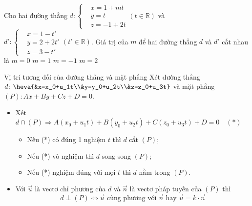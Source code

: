 \begin{ex}
	Cho hai đường thẳng $d: \left \lbrace \begin{aligned} &x=1+mt\\ &y=t  \\&z=-1+2t   \end{aligned} \right. (t \in \mathbb{R})$ và $d': \left \lbrace \begin{aligned} &x=1-t'\\ &y=2+2t'\\&z=3-t'   \end{aligned} \right. (t' \in \mathbb{R})$. Giá trị của $m$ để hai đường thẳng $d$ và $d'$ cắt nhau là
	\choice
	{\True $m=0$}
	{$m=1$}
	{$m=-1$}
	{$m=2$}
\end{ex}
\begin{dang}{Vị trí tương đối của đường thẳng và mặt phẳng}
	Xét đường thẳng $d \colon \heva{&x=x_0+u_1t\\&y=y_0+u_2t\\&z=z_0+u_3t}$ và mặt phẳng $(P) \colon Ax + By + Cz + D =0$.
	\begin{itemize}
		\item [\iconMT]  Xét $d \cap (P) \Rightarrow A(x_0+u_1t)+B(y_0+u_2t)+C(z_0+u_3t)+D=0 \quad (*)$
			\begin{itemize}
				\item [$\bullet$] Nếu (*) có đúng 1 nghiệm $t$ thì $d$ cắt $(P)$;
				\item [$\bullet$] Nếu (*) vô nghiệm  thì $d$ song song $(P)$;
				\item [$\bullet$] Nếu (*) nghiệm đúng với mọi $t$ thì $d$ nằm trong $(P)$.
			\end{itemize}
		\item [\iconMT]  Với $\vec{u}$ là vectơ chỉ phương của $d$ và $\vec{n}$ là vectơ pháp tuyến của $(P)$ thì
		$$d \perp (P) \Leftrightarrow \vec{u} \text{ cùng phương với } \vec{n} \text{ hay } \vec{u}=k \cdot\vec{n}$$
	\end{itemize}
\end{dang}
\viduminhhoa
\setcounter{vd}{0}

